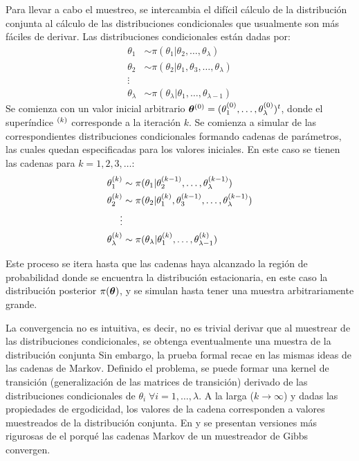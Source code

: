 \documentclass[../Main/Main.tex]{subfiles}
\begin{document}
Para llevar a cabo el muestreo, se intercambia el difícil cálculo de la distribución conjunta al cálculo de las distribuciones condicionales que usualmente son más fáciles de derivar. Las distribuciones condicionales están dadas por: 
\begin{align}
	\theta_1 &\sim \pi(\theta_1|\theta_2,\ldots,\theta_\lambda) \label{ec:DistCondicionales}\\
	\theta_2 &\sim \pi(\theta_2|\theta_1,\theta_3,\ldots,\theta_\lambda)\nonumber \\ 
	\vdots \nonumber\\
	\theta_\lambda &\sim \pi(\theta_\lambda|\theta_1,\ldots,\theta_{\lambda-1}) \nonumber
\end{align}
Se comienza con un valor inicial arbitrario $\bm{\theta}^{(0)} = (\theta_1^{(0)},\ldots,\theta_\lambda^{(0)})^t$, donde el superíndice $^{(k)}$ corresponde a la iteración $k$. Se comienza a simular de las correspondientes distribuciones condicionales formando cadenas de parámetros, las cuales quedan especificadas para los valores iniciales. En este caso se tienen las cadenas para $k = 1,2,3,\ldots$:
\begin{align}
	\theta_1^{(k)} &\sim \pi(\theta_1|\theta_2^{(k-1)},\ldots,\theta_\lambda^{(k-1)}) \label{ec:GibbsSampler}\\
	\theta_2^{(k)} &\sim \pi(\theta_2|\theta_1^{(k)},\theta_3^{(k-1)},\ldots,\theta_\lambda^{(k-1)})\nonumber \\ 
	\vdots \nonumber\\
	\theta_\lambda^{(k)} &\sim \pi(\theta_\lambda|\theta_1^{(k)},\ldots,\theta_{\lambda-1}^{(k)}) \nonumber
\end{align}

Este proceso se itera hasta que las cadenas haya alcanzado la región de probabilidad donde se encuentra la distribución estacionaria, en este caso la distribución posterior $\pi(\bm{\theta})$, y se simulan hasta tener una muestra arbitrariamente grande. 

La convergencia no es intuitiva, es decir, no es trivial derivar que al muestrear de las distribuciones condicionales, se obtenga eventualmente  una muestra de la distribución conjunta  Sin embargo, la prueba formal recae en  las mismas ideas de las cadenas de Markov. Definido el problema, se puede formar una kernel de transición (generalización de las matrices de transición) derivado de las  distribuciones condicionales de $\theta_i\;\forall i = 1,\ldots,\lambda$. A la larga ($k \rightarrow \infty$) y dadas las propiedades de ergodicidad, los valores de la cadena corresponden a valores muestreados de la distribución conjunta. En \citet{casella1992explaing} y \citet{tierney1994markov} se presentan versiones más rigurosas de el porqué las cadenas Markov de un muestreador de Gibbs convergen. 
\end{document}
